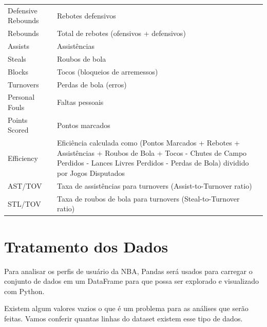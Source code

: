 \documentclass[
]{book}
\begin{document}
\begin{longtable}[]{@{}
  >{\raggedright\arraybackslash}p{}
  >{\raggedright\arraybackslash}p{}@{}}
Defensive Rebounds & Rebotes defensivos \\
Rebounds & Total de rebotes (ofensivos + defensivos) \\
Assists & Assistências \\
Steals & Roubos de bola \\
Blocks & Tocos (bloqueios de arremessos) \\
Turnovers & Perdas de bola (erros) \\
Personal Fouls & Faltas pessoais \\
Points Scored & Pontos marcados \\
Efficiency & Eficiência calculada como (Pontos Marcados + Rebotes + Assistências + Roubos de Bola + Tocos - Chutes de Campo Perdidos - Lances Livres Perdidos - Perdas de Bola) dividido por Jogos Disputados \\
AST/TOV & Taxa de assistências para turnovers (Assist-to-Turnover ratio) \\
STL/TOV & Taxa de roubos de bola para turnovers (Steal-to-Turnover ratio) \\
\bottomrule()
\end{longtable}

\hypertarget{tratamento-dos-dados}{%
\chapter{Tratamento dos Dados}\label{tratamento-dos-dados}}

Para analisar os perfis de usuário da NBA, Pandas será usados para carregar o conjunto de dados em um DataFrame para que possa ser explorado e visualizado com Python.

Existem algum valores vazios o que é um problema para as análises que serão feitas. Vamos conferir quantas linhas do dataset existem esse tipo de dados.
\end{document}
